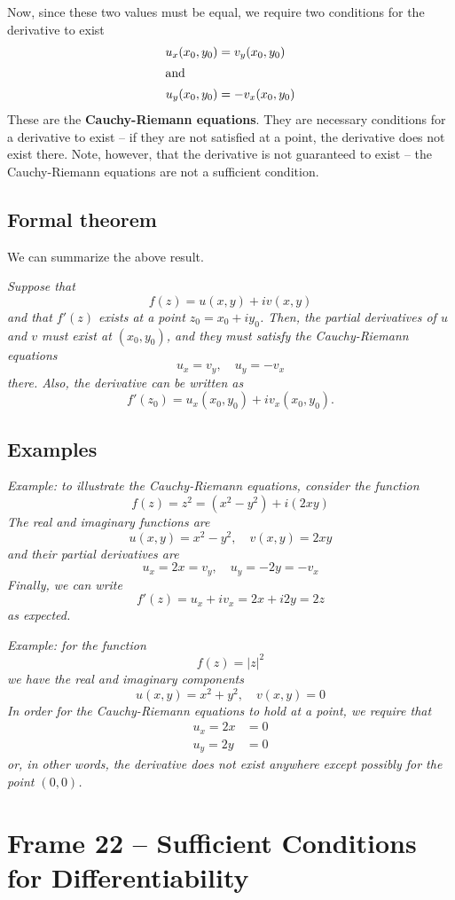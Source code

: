 \documentclass{article}
\renewcommand{\emph}{\textbf}
\begin{document}
Now, since these two values must be equal, we require two conditions for the derivative to exist
\begin{align*}
	u_x(x_0, y_0) &= v_y(x_0, y_0)	\\
\intertext{and}
	u_y(x_0, y_0) &= -v_x(x_0, y_0)
\end{align*}
These are the \emph{Cauchy-Riemann equations}. They are necessary conditions for a derivative to exist -- if they are not satisfied at a point, the derivative does not exist there. Note, however, that the derivative is not guaranteed to exist -- the Cauchy-Riemann equations are not a sufficient condition.

\subsection{Formal theorem}
We can summarize the above result.

\textit{Suppose that
\[
	f(z) = u(x, y) + iv(x, y)
\]
and that $f'(z)$ exists at a point $z_0 = x_0 + iy_0$. Then, the partial derivatives of $u$ and $v$ must exist at $(x_0, y_0)$, and they must satisfy the Cauchy-Riemann equations
\[
	u_x = v_y,	\quad	u_y = -v_x
\]
there. Also, the derivative can be written as
\[
	f'(z_0) = u_x(x_0, y_0) + iv_x(x_0, y_0).
\]}

\subsection{Examples}
\textit{Example: to illustrate the Cauchy-Riemann equations, consider the function
\[
	f(z) = z^2 = (x^2 - y^2) + i(2xy)
\]
The real and imaginary functions are
\[
	u(x, y) = x^2 - y^2,	\quad	v(x, y) = 2xy
\]
and their partial derivatives are
\[
	u_x = 2x = v_y, 	\quad	u_y = -2y = -v_x
\]
Finally, we can write 
\[
	f'(z) = u_x + iv_x = 2x + i2y = 2z
\]
as expected.}

\textit{Example: for the function
\[
	f(z) = |z|^2
\]
we have the real and imaginary components
\[
	u(x, y) = x^2 + y^2,	\quad	v(x, y) = 0
\]
In order for the Cauchy-Riemann equations to hold at a point, we require that
\begin{align*}
	u_x = 2x &= 0 \\
	u_y = 2y &= 0
\end{align*}
or, in other words, the derivative does not exist anywhere except possibly for the point $(0, 0)$.}

\clearpage
\section{Frame 22 -- Sufficient Conditions for Differentiability}
\end{document}
